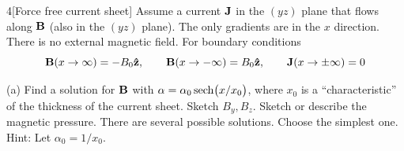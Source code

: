 \documentclass[12pt]{article}
\begin{document}
\begin{problem}{4}[Force free current sheet]
Assume a current $\vb{J}$ in the $(yz)$ plane that flows along $\vb{B}$ (also in
the $(yz)$ plane). The only gradients are in the $x$ direction. There is no
external magnetic field. For boundary conditions
\begin{equation}
    \vb{B}(x\to\infty)=-B_0\vb{\hat{z}},\qquad
    \vb{B}(x\to-\infty)=B_0\vb{\hat{z}},\qquad
    \vb{J}(x\to\pm\infty)=0
\end{equation}

(a) Find a solution for $\vb{B}$ with $\alpha=\alpha_0\sech(x/x_0)$, where $x_0$
is a ``characteristic'' of the thickness of the current sheet. Sketch $B_y,B_z$.
Sketch or describe the magnetic pressure. There are several possible solutions.
Choose the simplest one. Hint: Let $\alpha_0=1/x_0$.


\end{problem}
\end{document}
